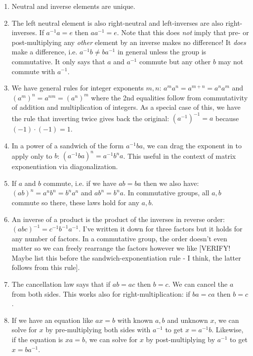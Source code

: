 \begin{enumerate}
\item Neutral and inverse elements are unique. 

\item The left neutral element is also right-neutral and left-inverses are also right-inverses. If $a^{-1} a = e$ then $a a^{-1} = e$. Note that this does \emph{not} imply that pre- or post-multiplying any \emph{other} element by an inverse makes no difference! It \emph{does} make a difference, i.e. $a^{-1} b \neq b a^{-1}$ in general unless the group is commutative. It only says that $a$ and $a^{-1}$ commute but any other $b$ may not commute with $a^{-1}$.

\item We have general rules for integer exponents $m,n$: $a^m a^n = a^{m+n} = a^n a^m$ and $(a^{m})^{n} = a^{n m} = (a^{n})^{m}$ where the 2nd equalities follow from commutativity of addition and multiplication of integers. As a special case of this, we have the rule that inverting twice gives back the original: $(a^{-1})^{-1} = a$ because $(-1) \cdot (-1) = 1$.

\item In a power of a sandwich of the form $a^{-1} b a$, we can drag the exponent in to apply only to $b$: $(a^{-1} b a)^n = a^{-1} b^n a$. This useful in the context of matrix exponentiation via diagonalization.

\item If $a$ and $b$ commute, i.e. if we have $a b = ba$ then we also have: $(a b)^n = a^n b^n = b^n a^n$ and $a b^n = b^n a$. In commutative groups, all $a,b$ commute so there, these laws hold for any $a,b$.

\item An inverse of a product is the product of the inverses in reverse order: $(a b c)^{-1} = c^{-1} b^{-1} a^{-1}$. I've written it down for three factors but it holds for any number of factors. In a commutative group, the order doesn't even matter so we can freely rearrange the factors however we like [VERIFY! Maybe list this before the sandwich-exponentiation rule - I think, the latter follows from this rule]. 

\item The cancellation law says that if $a b = a c$ then $b = c$. We can cancel the $a$ from both sides. This works also for right-multiplication: if $b a = c a$ then $b = c$. 

\item If we have an equation like $a x = b$ with known $a, b$ and unknown $x$, we can solve for $x$ by pre-multiplying both sides with $a^{-1}$ to get $x = a^{-1}b$. Likewise, if the equation is $x a = b$, we can solve for $x$ by post-multiplying by $a^{-1}$ to get $x = b a^{-1}$. 
\end{enumerate}

